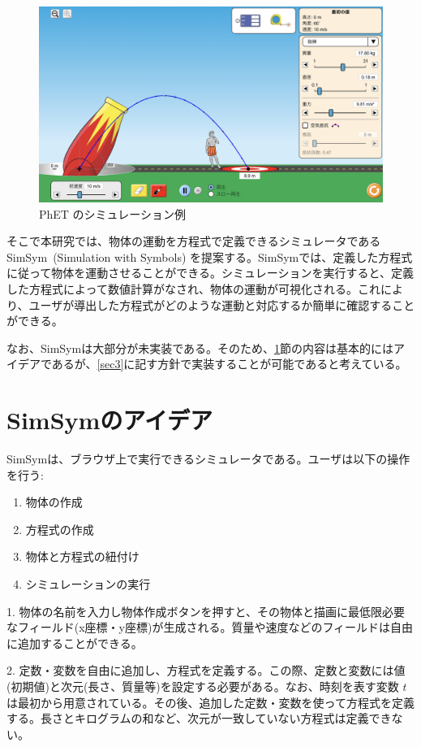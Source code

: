\documentclass[11pt, a4paper, oneside, twocolumn, dvipdfmx]{jsarticle}
\newcommand{\simname}{SimSym}
\newcommand{\simnamealt}{Simulation with Symbols}
\begin{document}
\begin{figure}[thb]
  \centering
  \includegraphics*[width=0.9\linewidth]{figure/PhET_example.png}
  \caption{PhET のシミュレーション例} \label{numeral_based}
  \end{figure}

そこで本研究では、物体の運動を方程式で定義できるシミュレータである \simname~(\simnamealt) を提案する。\simname では、定義した方程式に従って物体を運動させることができる。シミュレーションを実行すると、定義した方程式によって数値計算がなされ、物体の運動が可視化される。これにより、ユーザが導出した方程式がどのような運動と対応するか簡単に確認することができる。

なお、\simname は大部分が未実装である。そのため、\ref{sec2}節の内容は基本的にはアイデアであるが、\ref{sec3}に記す方針で実装することが可能であると考えている。

\section{\simname のアイデア} \label{sec2}

\simname は、ブラウザ上で実行できるシミュレータである。ユーザは以下の操作を行う:

\begin{enumerate}
\item 物体の作成
\item 方程式の作成
\item 物体と方程式の紐付け
\item シミュレーションの実行
\end{enumerate}

1. 物体の名前を入力し物体作成ボタンを押すと、その物体と描画に最低限必要なフィールド(x座標・y座標)が生成される。質量や速度などのフィールドは自由に追加することができる。

2. 定数・変数を自由に追加し、方程式を定義する。この際、定数と変数には値(初期値)と次元(長さ、質量等)を設定する必要がある。なお、時刻を表す変数 $t$ は最初から用意されている。その後、追加した定数・変数を使って方程式を定義する。長さとキログラムの和など、次元が一致していない方程式は定義できない。
\end{document}
